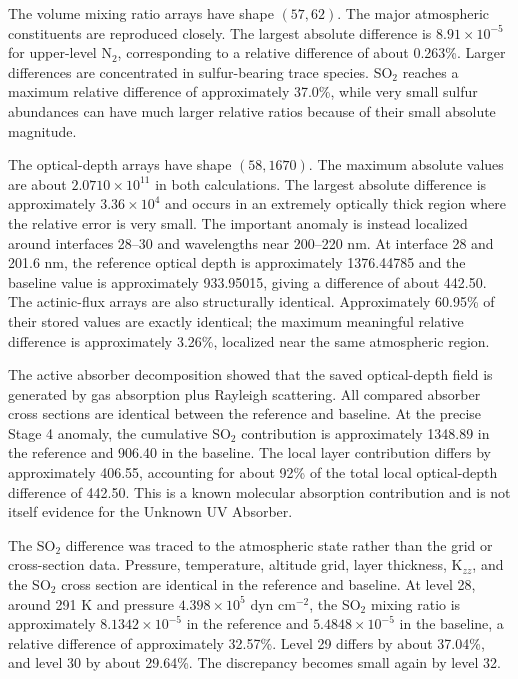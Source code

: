 \documentclass[10pt]{article}
\begin{document}
The volume mixing ratio arrays have shape $(57,62)$. The major atmospheric constituents are reproduced closely. The largest absolute difference is $8.91\times10^{-5}$ for upper-level N$_2$, corresponding to a relative difference of about 0.263\%. Larger differences are concentrated in sulfur-bearing trace species. SO$_2$ reaches a maximum relative difference of approximately 37.0\%, while very small sulfur abundances can have much larger relative ratios because of their small absolute magnitude.

The optical-depth arrays have shape $(58,1670)$. The maximum absolute values are about $2.0710\times10^{11}$ in both calculations. The largest absolute difference is approximately $3.36\times10^4$ and occurs in an extremely optically thick region where the relative error is very small. The important anomaly is instead localized around interfaces 28--30 and wavelengths near 200--220 nm. At interface 28 and 201.6 nm, the reference optical depth is approximately 1376.44785 and the baseline value is approximately 933.95015, giving a difference of about 442.50. The actinic-flux arrays are also structurally identical. Approximately 60.95\% of their stored values are exactly identical; the maximum meaningful relative difference is approximately 3.26\%, localized near the same atmospheric region.

The active absorber decomposition showed that the saved optical-depth field is generated by gas absorption plus Rayleigh scattering. All compared absorber cross sections are identical between the reference and baseline. At the precise Stage 4 anomaly, the cumulative SO$_2$ contribution is approximately 1348.89 in the reference and 906.40 in the baseline. The local layer contribution differs by approximately 406.55, accounting for about 92\% of the total local optical-depth difference of 442.50. This is a known molecular absorption contribution and is not itself evidence for the Unknown UV Absorber.

The SO$_2$ difference was traced to the atmospheric state rather than the grid or cross-section data. Pressure, temperature, altitude grid, layer thickness, K$_{zz}$, and the SO$_2$ cross section are identical in the reference and baseline. At level 28, around 291 K and pressure $4.398\times10^5$ dyn cm$^{-2}$, the SO$_2$ mixing ratio is approximately $8.1342\times10^{-5}$ in the reference and $5.4848\times10^{-5}$ in the baseline, a relative difference of approximately 32.57\%. Level 29 differs by about 37.04\%, and level 30 by about 29.64\%. The discrepancy becomes small again by level 32.
\end{document}
